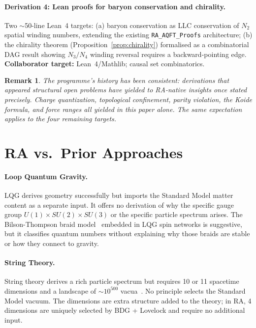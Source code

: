 \documentclass[11pt,a4paper]{article}
\newtheorem{remark}[theorem]{Remark}
\begin{document}
\paragraph{Derivation 4: Lean proofs for baryon conservation and chirality.}
Two $\sim$50-line Lean~4 targets: (a) baryon conservation as LLC conservation
of $N_2$ spatial winding numbers, extending the existing
\texttt{RA\_AQFT\_Proofs} architecture; (b) the chirality theorem
(Proposition~\ref{prop:chirality}) formalised as a combinatorial DAG result
showing $N_3/N_4$ winding reversal requires a backward-pointing edge.
\textbf{Collaborator target:} Lean~4/Mathlib; causal set combinatorics.

\begin{remark}
The programme's history has been consistent: derivations that appeared
structural open problems have yielded to RA-native insights once stated
precisely. Charge quantization, topological confinement, parity violation,
the Koide formula, and force ranges all yielded in this paper alone. The
same expectation applies to the four remaining targets.
\end{remark}

\section{RA vs.\ Prior Approaches}
\label{sec:comparison}

\paragraph{Loop Quantum Gravity.} LQG derives geometry successfully but imports
the Standard Model matter content as a separate input. It offers no derivation
of why the specific gauge group $U(1) \times SU(2) \times SU(3)$ or the specific
particle spectrum arises. The Bilson-Thompson braid model~\citep{BilsonThompson2005}
embedded in LQG spin networks is suggestive, but it classifies quantum numbers
without explaining why those braids are stable or how they connect to gravity.

\paragraph{String Theory.} String theory derives a rich particle spectrum but
requires 10 or 11 spacetime dimensions and a landscape of $\sim 10^{500}$
vacua~\citep{Susskind2003}. No principle selects the Standard Model vacuum.
The dimensions are extra structure added to the theory; in RA, 4 dimensions
are uniquely selected by BDG + Lovelock and require no additional input.
\end{document}
